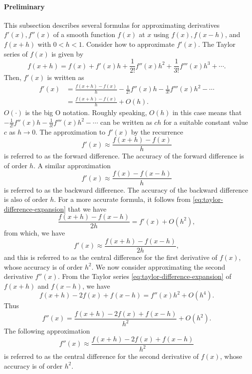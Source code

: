 \paragraph{{Preliminary}}\label{subsec:difference-preliminary}
{This subsection describes several formulas for approximating derivatives $f'(x),f''(x)$ of a smooth function $f(x)$ at $x$ using $f(x),f(x-h)$, and $f(x+h)$ with $0<h<1$. Consider how to approximate $f'(x)$. The Taylor series of $f(x)$ is given by}
\begin{equation}\label{eq:taylor-difference-expansion}
f(x+h)=f(x)+f'(x)h+\frac{1}{2!}f''(x)h^2+\frac{1}{3!}f'''(x)h^3+\cdots.
\end{equation}
{Then, $f'(x)$ is written as}
\[\begin{aligned}
f'(x)&=\frac{f(x+h)-f(x)}{h}-\frac{1}{2!}f''(x)h-\frac{1}{3!}f'''(x)h^2-\cdots\\
&=\frac{f(x+h)-f(x)}{h}+O(h).
\end{aligned}\]
{$O(\cdot)$ is the big O notation. Roughly speaking, $O(h)$ in this case means that $-\frac{1}{2!}f''(x)h-\frac{1}{3!}f'''(x)h^2-\cdots$ can be written as $ch$ for a suitable constant value $c$ as $h\to0$. The approximation to $f'(x)$ by the recurrence}
\begin{equation}\label{eq:forward-difference}
f'(x)\approx\frac{f(x+h)-f(x)}{h}
\end{equation}
{is referred to as the forward difference. The accuracy of the forward difference is of order $h$. A similar approximation}
\begin{equation}\label{eq:backward-difference}
f'(x)\approx\frac{f(x)-f(x-h)}{h}
\end{equation}
{is referred to as the backward difference. The accuracy of the backward difference is also of order $h$. For a more accurate formula, it follows from \eqref{eq:taylor-difference-expansion} that we have}
\[\frac{f(x+h)-f(x-h)}{2h}=f'(x)+O(h^2),\]
{from which, we have}
\begin{equation}\label{eq:central-first-difference}
f'(x)\approx\frac{f(x+h)-f(x-h)}{2h},
\end{equation}
{and this is referred to as the central difference for the first derivative of $f(x)$, whose accuracy is of order $h^2$.}
{We now consider approximating the second derivative $f''(x)$. From the Taylor series \eqref{eq:taylor-difference-expansion} of $f(x+h)$ and $f(x-h)$, we have}
\[f(x+h)-2f(x)+f(x-h)=f''(x)h^2+O(h^4).\]
{Thus}
\[f''(x)=\frac{f(x+h)-2f(x)+f(x-h)}{h^2}+O(h^2).\]
{The following approximation}
\begin{equation}\label{eq:central-second-difference}
f''(x)\approx\frac{f(x+h)-2f(x)+f(x-h)}{h^2}
\end{equation}
{is referred to as the central difference for the second derivative of $f(x)$, whose accuracy is of order $h^2$.}
